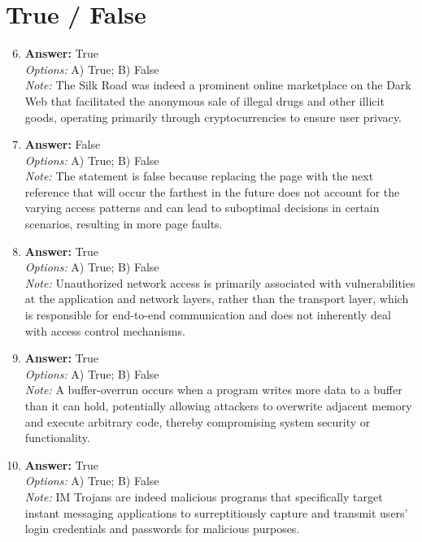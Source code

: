 \documentclass[12pt]{article}
\begin{document}
\section*{True / False}
\begin{enumerate}[label=\arabic*.]
\setcounter{enumi}{5}
\item \textbf{Answer:} True
\\ \textit{Options:} A) True; B) False
\\ \textit{Note:} The Silk Road was indeed a prominent online marketplace on the Dark Web that facilitated the anonymous sale of illegal drugs and other illicit goods, operating primarily through cryptocurrencies to ensure user privacy.
\item \textbf{Answer:} False
\\ \textit{Options:} A) True; B) False
\\ \textit{Note:} The statement is false because replacing the page with the next reference that will occur the farthest in the future does not account for the varying access patterns and can lead to suboptimal decisions in certain scenarios, resulting in more page faults.
\item \textbf{Answer:} True
\\ \textit{Options:} A) True; B) False
\\ \textit{Note:} Unauthorized network access is primarily associated with vulnerabilities at the application and network layers, rather than the transport layer, which is responsible for end-to-end communication and does not inherently deal with access control mechanisms.
\item \textbf{Answer:} True
\\ \textit{Options:} A) True; B) False
\\ \textit{Note:} A buffer-overrun occurs when a program writes more data to a buffer than it can hold, potentially allowing attackers to overwrite adjacent memory and execute arbitrary code, thereby compromising system security or functionality.
\item \textbf{Answer:} True
\\ \textit{Options:} A) True; B) False
\\ \textit{Note:} IM Trojans are indeed malicious programs that specifically target instant messaging applications to surreptitiously capture and transmit users' login credentials and passwords for malicious purposes.
\end{enumerate}
\end{document}
